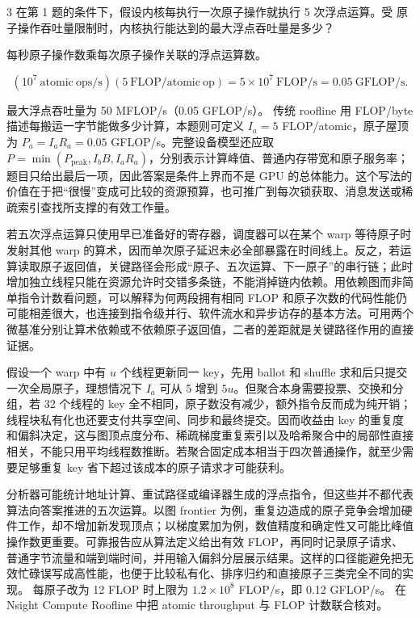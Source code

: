 \begin{solutionexercise}{3}
\problemheading 在第 1 题的条件下，假设内核每执行一次原子操作就执行 5 次浮点运算。受
原子操作吞吐量限制时，内核执行能达到的最大浮点吞吐量是多少？

\approachheading 每秒原子操作数乘每次原子操作关联的浮点运算数。

\answerheading
\[
(10^7\ \mathrm{atomic\ ops/s})(5\ \mathrm{FLOP/atomic\ op})
=5\times10^7\ \mathrm{FLOP/s}
=0.05\ \mathrm{GFLOP/s}.
\]

\conclusionheading 最大浮点吞吐量为 50 MFLOP/s（0.05 GFLOP/s）。
\discussionheading
{}传统 roofline 用 FLOP/byte 描述每搬运一字节能做多少计算，本题则可定义 $I_a=5$ FLOP/atomic，原子屋顶为 $P_a=I_aR_a=0.05$ GFLOP/s。完整设备模型还应取 $P=\min(P_{\mathrm{peak}},I_bB,I_aR_a)$，分别表示计算峰值、普通内存带宽和原子服务率；题目只给出最后一项，因此答案是条件上界而不是 GPU 的总体能力。这个写法的价值在于把“很慢”变成可比较的资源预算，也可推广到每次锁获取、消息发送或稀疏索引查找所支撑的有效工作量。

若五次浮点运算只使用早已准备好的寄存器，调度器可以在某个 warp 等待原子时发射其他 warp 的算术，因而单次原子延迟未必全部暴露在时间线上。反之，若运算读取原子返回值，关键路径会形成“原子、五次运算、下一原子”的串行链；此时增加独立线程只能在资源允许时交错多条链，不能消掉链内依赖。用依赖图而非简单指令计数看问题，可以解释为何两段拥有相同 FLOP 和原子次数的代码性能仍可能相差很大，也连接到指令级并行、软件流水和异步访存的基本方法。可用两个微基准分别让算术依赖或不依赖原子返回值，二者的差距就是关键路径作用的直接证据。

假设一个 warp 中有 $u$ 个线程更新同一 key，先用 ballot 和 shuffle 求和后只提交一次全局原子，理想情况下 $I_a$ 可从 5 增到 $5u$。但聚合本身需要投票、交换和分组，若 32 个线程的 key 全不相同，原子数没有减少，额外指令反而成为纯开销；线程块私有化也还要支付共享空间、同步和最终提交。因而收益由 key 的重复度和偏斜决定，这与图顶点度分布、稀疏梯度重复索引以及哈希聚合中的局部性直接相关，不能只用平均线程数推断。若聚合固定成本相当于四次普通操作，就至少需要足够重复 key 省下超过该成本的原子请求才可能获利。

分析器可能统计地址计算、重试路径或编译器生成的浮点指令，但这些并不都代表算法向答案推进的五次运算。以图 frontier 为例，重复边造成的原子竞争会增加硬件工作，却不增加新发现顶点；以梯度累加为例，数值精度和确定性又可能比峰值操作数更重要。可靠报告应从算法定义给出有效 FLOP，再同时记录原子请求、普通字节流量和端到端时间，并用输入偏斜分层展示结果。这样的口径能避免把无效忙碌误写成高性能，也便于比较私有化、排序归约和直接原子三类完全不同的实现。
\variantheading 每原子改为 12 FLOP 时上限为 $1.2\times10^8$ FLOP/s，即 0.12 GFLOP/s。
\practiceheading 在 Nsight Compute Roofline 中把 atomic throughput 与 FLOP 计数联合核对。
\end{solutionexercise}

